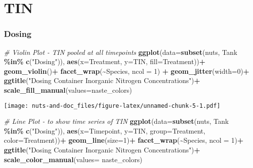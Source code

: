 \documentclass[
]{article}
\newenvironment{Shaded}{\begin{snugshade}}{\end{snugshade}}
\newcommand{\AttributeTok}[1]{\textcolor[rgb]{0.13,0.29,0.53}{#1}}
\newcommand{\CommentTok}[1]{\textcolor[rgb]{0.56,0.35,0.01}{\textit{#1}}}
\newcommand{\DecValTok}[1]{\textcolor[rgb]{0.00,0.00,0.81}{#1}}
\newcommand{\FunctionTok}[1]{\textcolor[rgb]{0.13,0.29,0.53}{\textbf{#1}}}
\newcommand{\NormalTok}[1]{#1}
\newcommand{\SpecialCharTok}[1]{\textcolor[rgb]{0.81,0.36,0.00}{\textbf{#1}}}
\newcommand{\StringTok}[1]{\textcolor[rgb]{0.31,0.60,0.02}{#1}}
\begin{document}
\hypertarget{tin}{%
\section{TIN}\label{tin}}

\hypertarget{dosing}{%
\subsubsection{Dosing}\label{dosing}}

\begin{Shaded}
\begin{Highlighting}[]
\CommentTok{\# Violin Plot {-} TIN pooled at all timepoints}
\FunctionTok{ggplot}\NormalTok{(}\AttributeTok{data=}\FunctionTok{subset}\NormalTok{(nuts, Tank }\SpecialCharTok{\%in\%} \FunctionTok{c}\NormalTok{(}\StringTok{"Dosing"}\NormalTok{)), }\FunctionTok{aes}\NormalTok{(}\AttributeTok{x=}\NormalTok{Treatment, }\AttributeTok{y=}\NormalTok{TIN, }\AttributeTok{fill=}\NormalTok{Treatment))}\SpecialCharTok{+}
  \FunctionTok{geom\_violin}\NormalTok{()}\SpecialCharTok{+}
  \FunctionTok{facet\_wrap}\NormalTok{(}\SpecialCharTok{\textasciitilde{}}\NormalTok{Species, }\AttributeTok{ncol =} \DecValTok{1}\NormalTok{) }\SpecialCharTok{+}
  \FunctionTok{geom\_jitter}\NormalTok{(}\AttributeTok{width=}\DecValTok{0}\NormalTok{)}\SpecialCharTok{+}
  \FunctionTok{ggtitle}\NormalTok{(}\StringTok{"Dosing Container Inorganic Nitrogen Concentrations"}\NormalTok{)}\SpecialCharTok{+}
  \FunctionTok{scale\_fill\_manual}\NormalTok{(}\AttributeTok{values=}\NormalTok{naste\_colors)}
\end{Highlighting}
\end{Shaded}

\texttt{[image: nuts-and-doc\_files/figure-latex/unnamed-chunk-5-1.pdf]}

\begin{Shaded}
\begin{Highlighting}[]
\CommentTok{\# Line Plot {-} to show time series of TIN}
\FunctionTok{ggplot}\NormalTok{(}\AttributeTok{data=}\FunctionTok{subset}\NormalTok{(nuts, Tank }\SpecialCharTok{\%in\%} \FunctionTok{c}\NormalTok{(}\StringTok{"Dosing"}\NormalTok{)), }\FunctionTok{aes}\NormalTok{(}\AttributeTok{x=}\NormalTok{Timepoint, }\AttributeTok{y=}\NormalTok{TIN, }\AttributeTok{group=}\NormalTok{Treatment, }\AttributeTok{color=}\NormalTok{Treatment))}\SpecialCharTok{+}
  \FunctionTok{geom\_line}\NormalTok{(}\AttributeTok{size=}\DecValTok{1}\NormalTok{)}\SpecialCharTok{+}
  \FunctionTok{facet\_wrap}\NormalTok{(}\SpecialCharTok{\textasciitilde{}}\NormalTok{Species, }\AttributeTok{ncol =} \DecValTok{1}\NormalTok{)}\SpecialCharTok{+}
  \FunctionTok{ggtitle}\NormalTok{(}\StringTok{"Dosing Container Inorganic Nitrogen Concentrations"}\NormalTok{)}\SpecialCharTok{+}
  \FunctionTok{scale\_color\_manual}\NormalTok{(}\AttributeTok{values=}\NormalTok{ naste\_colors)}
\end{Highlighting}
\end{Shaded}
\end{document}
